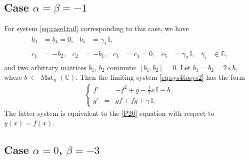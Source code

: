 \documentclass{article}
\theoremstyle{plain}
\DeclareMathOperator{\Mat}{Mat}
\begin{document}
\subsection{Case \texorpdfstring{$\alpha = \beta = -1$}{alpha = beta = -1}}

For system \eqref{eq:case1tail} corresponding to this case, we have
\begin{gather*}
    \begin{aligned}
    b_3
    &= b_4
    = 0, 
    &
    b_5 
    &= \gamma_1 \, \mathbb{I},
    \end{aligned}
    \\[1mm]
    \begin{aligned}
    c_1
    &= - b_2,
    &
    c_2
    &= - b_1,
    &
    c_3
    &= c_4
    = 0,
    &
    c_5
    &= \gamma_2 \, \mathbb{I},
    &
    \gamma_i 
    &\in \mathbb{C},
    \end{aligned}
\end{gather*}
and two arbitrary matrices $b_1$, $b_2$ commute: $[b_1, b_2] = 0$.  Let $b_1 = b_2 = 2 \, \varepsilon \, b$, where $b~\in~\Mat_n (\mathbb{C})$. Then the limiting system \eqref{eq:sys4tosys2} has the form 
\begin{gather*}
    \left\{
    \begin{array}{lcl}
    f'
    &=& - f^2 + g - \frac12 x \, \mathbb{I} - b,
    \\[2mm]
    g'
    &=& g f + f g + \gamma \, \mathbb{I}.
    \end{array}
    \right.
\end{gather*}
The latter system is equivalent to the \ref{P20} equation with respect to $y (x) = f (x)$. 

\subsection{Case \texorpdfstring{$\alpha = 0$, $\beta = - 3$}{alpha = 0, beta = -3}}
\end{document}
